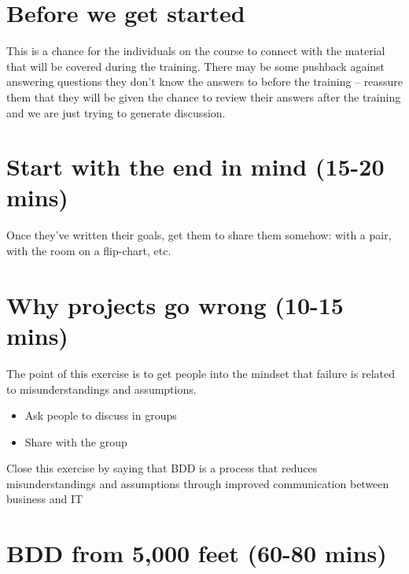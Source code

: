 \section*{Before we get started}

This is a chance for the individuals on the course to connect with the material that will be covered during the training. There may be some pushback against answering questions they don't know the answers to before the training – reassure them that they will be given the chance to review their answers after the training and we are just trying to generate discussion.

\section*{Start with the end in mind	(15-20 mins)}

Once they've written their goals, get them to share them somehow: with a pair, with the room on a flip-chart, etc.

\section*{Why projects go wrong	(10-15 mins)}

The point of this exercise is to get people into the mindset that failure is related to misunderstandings and assumptions.

\begin{itemize}
    \item Ask people to discuss in groups
    \item Share with the group
\end{itemize}

Close this exercise by saying that BDD is a process that reduces misunderstandings and assumptions through improved communication between business and IT

\section*{BDD from 5,000 feet	(60-80 mins)}

